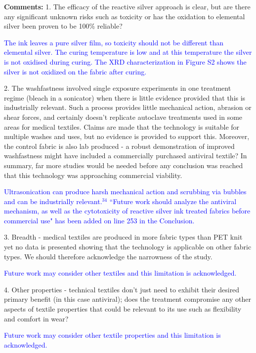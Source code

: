 \documentclass[12pt]{letter}
\newcommand{\blue}[1]{\textcolor{blue}{#1}} %
\begin{document}
\textbf{Comments:} 
1. The efficacy of the reactive silver approach is clear, but are there any significant unknown risks such as toxicity or has the oxidation to elemental silver been proven to be 100\% reliable?

\blue{The ink leaves a pure silver film, so toxicity should not be different than elemental silver. The curing temperature is low and at this temperature the silver is not oxidised during curing. The XRD characterization in Figure S2 shows the silver is not oxidized on the fabric after curing. }

2. The washfastness involved single exposure experiments in one treatment regime (bleach in a sonicator) when there is little evidence provided that this is industrially relevant. Such a process provides little mechanical action, abrasion or shear forces, and certainly doesn't replicate autoclave treatments used in some areas for medical textiles. Claims are made that the technology is suitable for multiple washes and uses, but no evidence is provided to support this. Moreover, the control fabric is also lab produced - a robust demonstration of improved washfastness might have included a commercially purchased antiviral textile? In summary, far more studies would be needed before any conclusion was reached that this technology was approaching commercial viability.

\blue{Ultrasonication can produce harsh mechanical action and scrubbing via bubbles and can be industrially relevant.$^34$ ``Future work should analyze the antiviral mechanism, as well as the cytotoxicity of reactive silver ink treated fabrics before
commercial use" has been added on line 253 in the Conclusion.  }

3. Breadth - medical textiles are produced in more fabric types than PET knit yet no data is presented showing that the technology is applicable on other fabric types. We should therefore acknowledge the narrowness of the study.

\blue{Future work may consider other textiles and this limitation is acknowledged.  }

4. Other properties - technical textiles don't just need to exhibit their desired primary benefit (in this case antiviral); does the treatment compromise any other aspects of textile properties that could be relevant to its use such as flexibility and comfort in wear?

\blue{Future work may consider other textile properties and this limitation is acknowledged.  }
\end{document}
